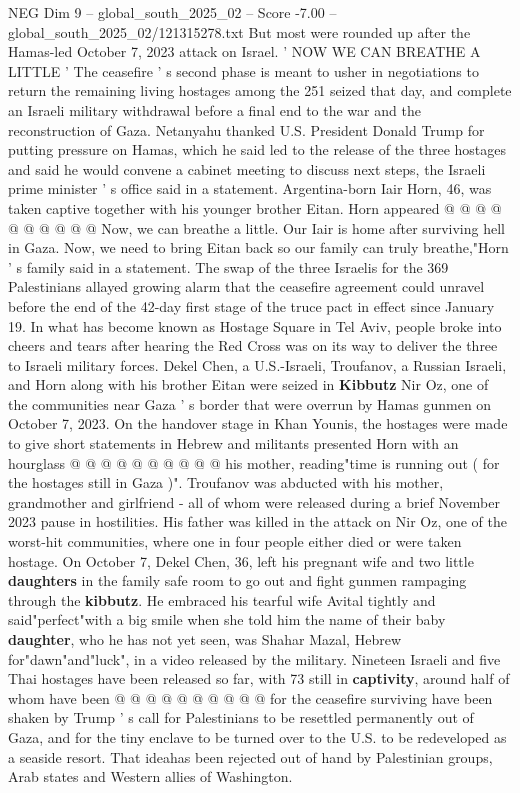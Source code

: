 \begin{textsample}{NEG Dim 9 – global\_south\_2025\_02 – Score -7.00 – global\_south\_2025\_02/121315278.txt}
But most were rounded up after the Hamas-led October 7, 2023 attack on Israel. ' NOW WE CAN BREATHE A LITTLE ' The ceasefire ' s second phase is meant to usher in negotiations to return the remaining living hostages among the 251 seized that day, and complete an Israeli military withdrawal before a final end to the war and the reconstruction of Gaza.
Netanyahu thanked U.S.
President Donald Trump for putting pressure on Hamas, which he said led to the release of the three hostages and said he would convene a cabinet meeting to discuss next steps, the Israeli prime minister ' s office said in a statement.
Argentina-born Iair Horn, 46, was taken captive together with his younger brother Eitan.
Horn appeared @ @ @ @ @ @ @ @ @ @ Now, we can breathe a little.
Our Iair is home after surviving hell in Gaza.
Now, we need to bring Eitan back so our family can truly breathe,"Horn ' s family said in a statement.
The swap of the three Israelis for the 369 Palestinians allayed growing alarm that the ceasefire agreement could unravel before the end of the 42-day first stage of the truce pact in effect since January 19.
In what has become known as Hostage Square in Tel Aviv, people broke into cheers and tears after hearing the Red Cross was on its way to deliver the three to Israeli military forces.
Dekel Chen, a U.S.-Israeli, Troufanov, a Russian Israeli, and Horn along with his brother Eitan were seized in \textbf{Kibbutz} Nir Oz, one of the communities near Gaza ' s border that were overrun by Hamas gunmen on October 7, 2023.
On the handover stage in Khan Younis, the hostages were made to give short statements in Hebrew and militants presented Horn with an hourglass @ @ @ @ @ @ @ @ @ @ his mother, reading"time is running out ( for the hostages still in Gaza )".
Troufanov was abducted with his mother, grandmother and girlfriend - all of whom were released during a brief November 2023 pause in hostilities.
His father was killed in the attack on Nir Oz, one of the worst-hit communities, where one in four people either died or were taken hostage.
On October 7, Dekel Chen, 36, left his pregnant wife and two little \textbf{daughters} in the family safe room to go out and fight gunmen rampaging through the \textbf{kibbutz}.
He embraced his tearful wife Avital tightly and said"perfect"with a big smile when she told him the name of their baby \textbf{daughter}, who he has not yet seen, was Shahar Mazal, Hebrew for"dawn"and"luck", in a video released by the military.
Nineteen Israeli and five Thai hostages have been released so far, with 73 still in \textbf{captivity}, around half of whom have been @ @ @ @ @ @ @ @ @ @ for the ceasefire surviving have been shaken by Trump ' s call for Palestinians to be resettled permanently out of Gaza, and for the tiny enclave to be turned over to the U.S. to be redeveloped as a seaside resort.
That ideahas been rejected out of hand by Palestinian groups, Arab states and Western allies of Washington.

\end{textsample}

